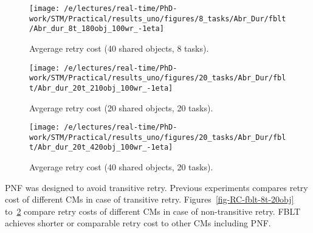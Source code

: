 \documentclass[conference]{IEEEtran}
\begin{document}
\begin{figure}
\centering
\texttt{[image: /e/lectures/real-time/PhD-work/STM/Practical/results\_uno/figures/8\_tasks/Abr\_Dur/fblt/Abr\_dur\_8t\_180obj\_100wr\_-1eta]}
\caption{Avgerage retry cost (40 shared objects, 8 tasks).}
\label{fig-RC-fblt-8t-40obj}
\end{figure}

\begin{figure}
\centering
\texttt{[image: /e/lectures/real-time/PhD-work/STM/Practical/results\_uno/figures/20\_tasks/Abr\_Dur/fblt/Abr\_dur\_20t\_210obj\_100wr\_-1eta]}
\caption{Avgerage retry cost (20 shared objects, 20 tasks).}
\label{fig-RC-fblt-20t-20obj}
\end{figure}

\begin{figure}
\centering
\texttt{[image: /e/lectures/real-time/PhD-work/STM/Practical/results\_uno/figures/20\_tasks/Abr\_Dur/fblt/Abr\_dur\_20t\_420obj\_100wr\_-1eta]}
\caption{Avgerage retry cost (40 shared objects, 20 tasks).}
\label{fig-RC-fblt-20t-40obj}
\end{figure}

PNF was designed to avoid transitive retry. Previous experiments compares retry cost of different CMs in case of transitive retry. Figures~\ref{fig-RC-fblt-8t-20obj} to~\ref{fig-RC-fblt-20t-20obj}  compare retry costs of different CMs in case of non-transitive retry. FBLT achieves shorter or comparable retry cost to other CMs including PNF.

\begin{comment}
\begin{figure}
\centering
\texttt{[image: /e/lectures/real-time/PhD-work/STM/Practical/results\_uno/figures/4\_tasks/Abr\_Dur/fblt/Abr\_dur\_4t\_20obj\_100wr\_-1eta]}
\caption{Avgerage retry cost (20 shared objects, 4 tasks).}
\label{fig-RC-fblt-20t-20obj}
\end{figure}

\begin{figure}
\centering
\texttt{[image: /e/lectures/real-time/PhD-work/STM/Practical/results\_uno/figures/8\_tasks/Abr\_Dur/fblt/Abr\_dur\_8t\_20obj\_100wr\_-1eta]}
\caption{Avgerage retry cost (20 shared objects, 8 tasks).}
\label{fig-RC-fblt-8t-20obj}
\end{figure}

\begin{figure}
\centering
\texttt{[image: /e/lectures/real-time/PhD-work/STM/Practical/results\_uno/figures/20\_tasks/Abr\_Dur/fblt/Abr\_dur\_20t\_20obj\_100wr\_-1eta]}
\caption{Avgerage retry cost (20 shared objects, 20 tasks).}
\label{fig-RC-fblt-20t-20obj}
\end{figure}
\end{comment}
\end{document}
